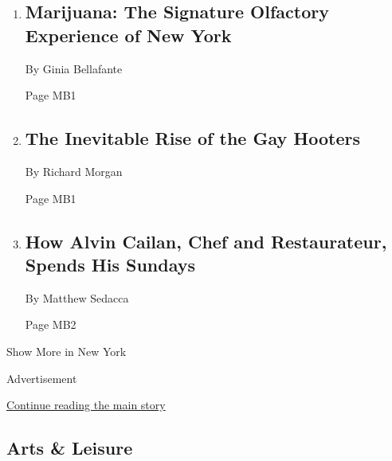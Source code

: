 \begin{enumerate}
\def\labelenumi{\arabic{enumi}.}
\item
  \href{/2018/06/21/nyregion/marijuana-the-signature-olfactory-experience-of-new-york.html}{}

  \hypertarget{marijuana-the-signature-olfactory-experience-of-new-york}{%
  \subsection{Marijuana: The Signature Olfactory Experience of New
  York}\label{marijuana-the-signature-olfactory-experience-of-new-york}}

  By Ginia Bellafante

  Page MB1
\item
  \href{/2018/06/21/nyregion/the-inevitable-rise-of-the-gay-hooters.html}{}

  \hypertarget{the-inevitable-rise-of-the-gay-hooters}{%
  \subsection{The Inevitable Rise of the Gay
  Hooters}\label{the-inevitable-rise-of-the-gay-hooters}}

  By Richard Morgan

  Page MB1
\item
  \href{/2018/06/22/nyregion/how-alvin-cailan-chef-and-restaurateur-spends-his-sundays.html}{}

  \hypertarget{how-alvin-cailan-chef-and-restaurateur-spends-his-sundays}{%
  \subsection{How Alvin Cailan, Chef and Restaurateur, Spends His
  Sundays}\label{how-alvin-cailan-chef-and-restaurateur-spends-his-sundays}}

  By Matthew Sedacca

  Page MB2
\end{enumerate}

Show More in New York

Advertisement

\protect\hyperlink{after-mid3}{Continue reading the main story}

\hypertarget{arts--leisure}{%
\subsection{Arts \& Leisure}\label{arts--leisure}}

